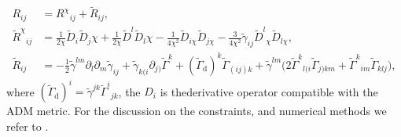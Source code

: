 %
\begin{equation*}
\begin{aligned}
    R_{ij} &= {R^{\chi}}_{ij} + \widetilde{R}_{ij}, \\
    {\widetilde{R}^{\chi}}_{ij} &= \frac{1}{2\chi}\widetilde{D}_i\widetilde{D}_j\chi + \frac{1}{2\chi}\widetilde{D}^l\widetilde{D}_l\chi - 
    \frac{1}{4\chi^2}\widetilde{D}_{i\chi}\widetilde{D}_{j\chi} - \frac{3}{4\chi^2}\widetilde{\gamma}_{ij}{\widetilde{D}^l}_{\chi}\widetilde{D}_{l\chi}, \\
    \widetilde{R}_{ij} &= -\frac{1}{2}\widetilde{\gamma}^{lm}\partial_l\partial_m\widetilde{\gamma}_{ij} + 
    \widetilde{\gamma}_{k(i}\partial_{j)}\widetilde{\Gamma}^k + (\widetilde{\Gamma}_{\text{d}})^k \widetilde{\Gamma}_{(ij)k} + \widetilde{\gamma}^{lm}
    \Big(2{\widetilde{\Gamma}^k}_{l(i}\widetilde{\Gamma}_{j)km} + {\widetilde{\Gamma}^k}_{im} \widetilde{\Gamma}_{klj} \Big), 
\end{aligned}
\end{equation*}
%
where $(\widetilde{\Gamma}_{\text{d}})^i = \widetilde{\gamma}^{jk}{\widetilde{\Gamma}^i}_{jk}$, 
the $D_i$ is thederivative operator compatible with the \ac{ADM} metric.
%
%
For the discussion on the constraints, and numerical methods we refer to \citet{Hilditch:2012fp}.




